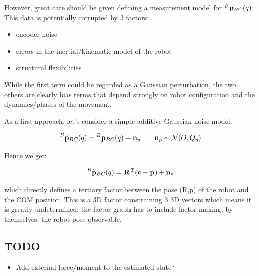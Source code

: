 \documentclass[11pt]{article}
\newcommand{\Rot}[2]{\prescript{#1}{}{\bfR}_{#2}}
\newcommand{\noise}{\bfn}
\newcommand{\posi}[2]{\prescript{#1}{}{\bfp}_{#2}}
\newcommand{\posim}[2]{\prescript{#1}{}{\widetilde{\bfp}}_{#2}}
\newcommand{\COM}{\bfc}
\newcommand{\Gaussian}[2]{\mathcal{N}({#1},{#2})}
\begin{document}
However, great care should be given defining a measurement model for \(\posi{B}{BC}(q)\). This data is potentially corrupted by 3 factors:
\begin{itemize}
    \item encoder noise
    \item errors in the inertial/kinematic model of the robot
    \item structural flexibilities
\end{itemize}

While the first term could be regarded as a Gaussian perturbation, the two others are clearly bias terms that depend strongly on robot configuration and the dynamics/phases of the movement.  

As a first approach, let's consider a simple additive Gaussian noise model:

\begin{equation}
    \posim{B}{BC}(q) = \posi{B}{BC}(q) + \noise_p ~~~~~~ \noise_p \sim \Gaussian{O}{Q_p}
\end{equation}

Hence we get:

\begin{equation}
    \posim{B}{BC}(q) = \Rot{}{}^T(\COM - \posi{}{}) + \noise_p
\end{equation}

which directly defines a tertiary factor between the pose (R,p) of the robot and the COM position. This is a 3D factor constraining 3 3D vectors which means it is greatly undetermined: the factor graph has to include factor making, by themselves, the robot pose observable.



\subsection{TODO}
\begin{itemize}
    \item Add external force/moment to the estimated state? 
\end{itemize}
\end{document}

